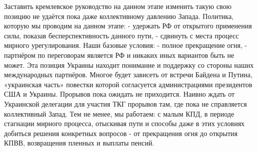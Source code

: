 Заставить кремлевское руководство на данном этапе изменить такую свою позицию не удаётся пока даже коллективному давлению Запада. 
Политика, которую мы проводим на данном этапе:
- удержать РФ от открытого применения силы, показав бесперспективность данного пути,
- сдвинуть с места процесс мирного урегулирования.
Наши базовые условия:
- полное прекращение огня,
- партнёром по переговорам является РФ и никаких иных вариантов быть не может.
Эта позиция Украины находит понимание и поддержку со стороны наших международных партнёров.
Многое будет зависеть от встречи Байдена и Путина, «украинская часть» повестки которой согласуется администрациями президентов США и Украины.
Прорывов пока ожидать не приходится.
Наивно ждать от Украинской делегации для участия ТКГ прорывов там, где пока не справляется коллективный Запад.
Тем не менее, мы работаем: с малым КПД, в периоде стагнации мирного процесса, отыскивая пути и способы даже в этих условиях добиться решения конкретных вопросов - от прекращения огня до открытия КПВВ, возвращения пленных и выплаты пенсий.
